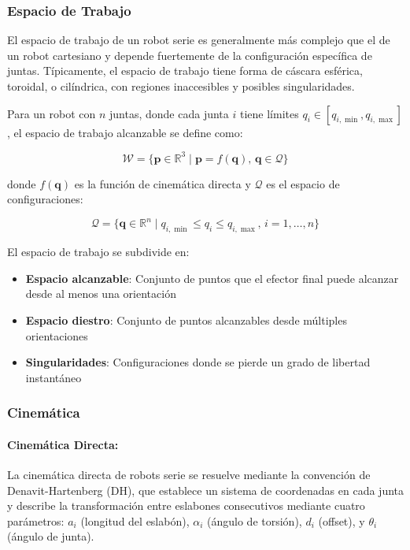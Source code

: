 \subsubsection{Espacio de Trabajo}

El espacio de trabajo de un robot serie es generalmente más complejo que el de un robot cartesiano y depende fuertemente de la configuración específica de juntas. Típicamente, el espacio de trabajo tiene forma de cáscara esférica, toroidal, o cilíndrica, con regiones inaccesibles y posibles singularidades.

Para un robot con $n$ juntas, donde cada junta $i$ tiene límites $q_i \in [q_{i,\min}, q_{i,\max}]$, el espacio de trabajo alcanzable se define como:

\begin{equation}
\mathcal{W} = \{\mathbf{p} \in \mathbb{R}^3 \mid \mathbf{p} = f(\mathbf{q}), \, \mathbf{q} \in \mathcal{Q}\}
\end{equation}

donde $f(\mathbf{q})$ es la función de cinemática directa y $\mathcal{Q}$ es el espacio de configuraciones:

\begin{equation}
\mathcal{Q} = \{\mathbf{q} \in \mathbb{R}^n \mid q_{i,\min} \leq q_i \leq q_{i,\max}, \, i = 1, \ldots, n\}
\end{equation}

El espacio de trabajo se subdivide en:

\begin{itemize}
    \item \textbf{Espacio alcanzable}: Conjunto de puntos que el efector final puede alcanzar desde al menos una orientación
    \item \textbf{Espacio diestro}: Conjunto de puntos alcanzables desde múltiples orientaciones
    \item \textbf{Singularidades}: Configuraciones donde se pierde un grado de libertad instantáneo
\end{itemize}

\subsubsection{Cinemática}

\paragraph{Cinemática Directa:} 

La cinemática directa de robots serie se resuelve mediante la convención de Denavit-Hartenberg (DH), que establece un sistema de coordenadas en cada junta y describe la transformación entre eslabones consecutivos mediante cuatro parámetros: $a_i$ (longitud del eslabón), $\alpha_i$ (ángulo de torsión), $d_i$ (offset), y $\theta_i$ (ángulo de junta).

